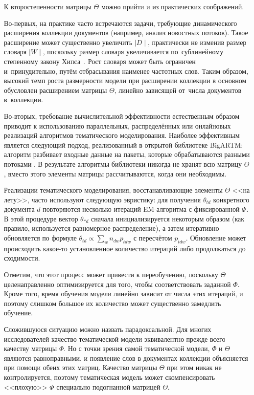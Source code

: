 К второстепенности матрицы $\Theta$ можно прийти и из практических соображений.

Во-первых, на практике часто встречаются задачи, требующие динамического расширения коллекции документов (например, анализ новостных потоков). Такое расширение может существенно увеличить $\mid D\mid$, практически не изменив размер словаря $\mid W \mid$, поскольку размер словаря увеличивается по~сублинейному степенному закону Хипса~\cite{egghe07untangling}. Рост словаря может быть ограничен и~принудительно, путём отбрасывания наименее частотных слов. Таким образом, высокий темп роста размерности модели при расширении коллекции в основном обусловлен расширением матрицы $\Theta$, линейно зависящей от~числа документов в~коллекции.

Во-вторых, требование вычислительной эффективности естественным образом приводит к использованию параллельных, распределённых или онлайновых реализаций алгоритмов тематического моделирования. Наиболее эффективным является следующий подход, реализованный в открытой библиотеке BigARTM: алгоритм разбивает входные данные на пакеты, которые обрабатываются разными потоками \cite{frei2016parallel}. В результате алгоритмы библиотеки никогда не хранят всю матрицу $\Theta$, вместо этого элементы матрицы рассчитываются, когда они необходимы.

Реализации тематического моделирования, восстанавливающие элементы $\Theta$ <<на лету>>, часто используют следующую эвристику: для получения $\theta_{td}$ конкретного документа $d$ повторяются несколько итераций EM-алгоритма с фиксированной $\Phi$. В этой процедуре вектор $\theta_{\ast d}$ сначала инициализируется некоторым образом (как правило, используется равномерное распределение), а затем итеративно обновляется по формуле $\theta_{td}  \propto \sum_{w} n_{dw} p_{tdw}$ с пересчётом $p_{tdw}$. Обновление может происходить какое-то установленное количество итераций либо продолжаться до сходимости.

Отметим, что этот процесс может привести к переобучению, поскольку $\Theta$ целенаправленно оптимизируется для того, чтобы соответствовать заданной $\Phi$. Кроме того, время обучения модели линейно зависит от числа этих итераций, и поэтому слишком большое их количество может существенно замедлить обучение.

Сложившуюся ситуацию можно назвать парадоксальной. Для многих исследователей качество тематической модели эквивалентно прежде всего качеству матрицы $\Phi$. Но с точки зрения самой тематической модели, $\Phi$ и $\Theta$ являются равноправными, и появление слов в документах коллекции объясняется при помощи обеих этих матриц. Качество матрицы $\Theta$ при этом никак не контролируется, поэтому тематическая модель может скомпенсировать <<плохую>> $\Phi$ специально подогнанной матрицей $\Theta$.

